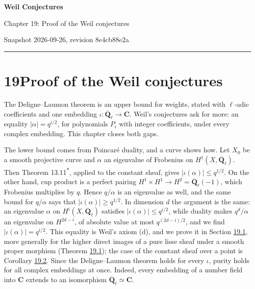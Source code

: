 \documentclass[11pt]{article}
\newcommand{\bpout}[1]{#1\textsuperscript{\hyperlink{bp-outside}{\ensuremath{\ast}}}}
\begin{document}
\pagestyle{plain}
\begin{center}
{\LARGE\bfseries Weil Conjectures\par}
\vspace{0.7em}
{\large Chapter 19: Proof of the Weil conjectures\par}
\vspace{0.5em}
{\small\color{bpmuted}Snapshot 2026-09-26, revision 8e4cb88e2a\par}
\end{center}
\vspace{0.5em}
{\small\tableofcontents}
\bigskip\hrule\bigskip

\section*{\texorpdfstring{19\quad Proof of the Weil conjectures}{19 Proof of the Weil conjectures}}
\label{bp1}%
\label{bp2}%
The Deligne–Laumon theorem is an upper bound for weights, stated with \(\ell\)-adic coefficients and one embedding \(\iota:\overline{\mathbf Q}_\ell\to\mathbf C\). Weil's conjectures ask for more: an equality \(|\alpha|=q^{i/2}\), for polynomials \(P_i\) with integer coefficients, under every complex embedding. This chapter closes both gaps.

The lower bound comes from Poincaré duality, and a curve shows how. Let \(X_0\) be a smooth projective curve and \(\alpha\) an eigenvalue of Frobenius on \(H^1(X,\overline{\mathbf Q}_\ell)\). Then Theorem \bpout{13.11}, applied to the constant sheaf, gives \(|\iota(\alpha)|\le q^{1/2}\). On the other hand, cup product is a perfect pairing \(H^1\times H^1\to H^2=\overline{\mathbf Q}_\ell(-1)\), which Frobenius multiplies by \(q\). Hence \(q/\alpha\) is an eigenvalue as well, and the same bound for \(q/\alpha\) says that \(|\iota(\alpha)|\ge q^{1/2}\). In dimension \(d\) the argument is the same: an eigenvalue \(\alpha\) on \(H^i(X,\overline{\mathbf Q}_\ell)\) satisfies \(|\iota(\alpha)|\le q^{i/2}\), while duality makes \(q^d/\alpha\) an eigenvalue on \(H^{2d-i}\), of absolute value at most \(q^{(2d-i)/2}\), and we find \(|\iota(\alpha)|=q^{i/2}\). This equality is Weil's axiom (d), and we prove it in Section \hyperref[bp3]{19.1}, more generally for the higher direct images of a pure lisse sheaf under a smooth proper morphism (Theorem \hyperref[bp5]{19.1}); the case of the constant sheaf over a point is Corollary \hyperref[bp8]{19.2}. Since the Deligne–Laumon theorem holds for every \(\iota\), purity holds for all complex embeddings at once. Indeed, every embedding of a number field into \(\mathbf C\) extends to an isomorphism \(\overline{\mathbf Q}_\ell\simeq\mathbf C\).
\end{document}
